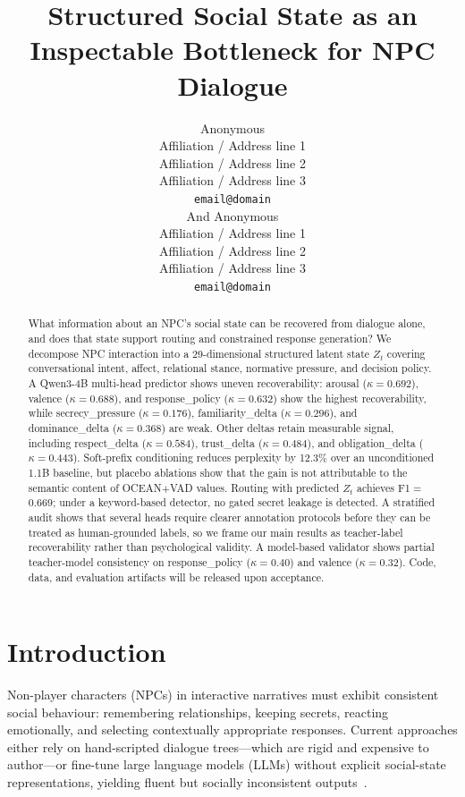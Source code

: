 \documentclass[11pt]{article}
\title{Structured Social State as an Inspectable Bottleneck for NPC Dialogue}
\author{Anonymous \\
  Affiliation / Address line 1 \\
  Affiliation / Address line 2 \\
  Affiliation / Address line 3 \\
  \texttt{email@domain} \\And
  Anonymous \\
  Affiliation / Address line 1 \\
  Affiliation / Address line 2 \\
  Affiliation / Address line 3 \\
  \texttt{email@domain} \\}
\begin{document}
\maketitle

\begin{abstract}
What information about an NPC's social state can be recovered from dialogue alone, and does that state support routing and constrained response generation?
We decompose NPC interaction into a 29-dimensional structured latent state $Z_t$ covering conversational intent, affect, relational stance, normative pressure, and decision policy.
A Qwen3-4B multi-head predictor shows uneven recoverability: arousal ($\kappa{=}0.692$), valence ($\kappa{=}0.688$), and response\_policy ($\kappa{=}0.632$) show the highest recoverability, while secrecy\_pressure ($\kappa{=}0.176$), familiarity\_delta ($\kappa{=}0.296$), and dominance\_delta ($\kappa{=}0.368$) are weak.
Other deltas retain measurable signal, including respect\_delta ($\kappa{=}0.584$), trust\_delta ($\kappa{=}0.484$), and obligation\_delta ($\kappa{=}0.443$).
Soft-prefix conditioning reduces perplexity by 12.3\% over an unconditioned 1.1B baseline, but placebo ablations show that the gain is not attributable to the semantic content of OCEAN+VAD values.
Routing with predicted $Z_t$ achieves F1$=$0.669; under a keyword-based detector, no gated secret leakage is detected.
A stratified audit shows that several heads require clearer annotation protocols before they can be treated as human-grounded labels, so we frame our main results as teacher-label recoverability rather than psychological validity.
A model-based validator shows partial teacher-model consistency on response\_policy ($\kappa{=}0.40$) and valence ($\kappa{=}0.32$).
Code, data, and evaluation artifacts will be released upon acceptance.
\end{abstract}

\section{Introduction}
\label{sec:intro}

Non-player characters (NPCs) in interactive narratives must exhibit consistent social behaviour: remembering relationships, keeping secrets, reacting emotionally, and selecting contextually appropriate responses.
Current approaches either rely on hand-scripted dialogue trees---which are rigid and expensive to author---or fine-tune large language models (LLMs) without explicit social-state representations, yielding fluent but socially inconsistent outputs~\cite{park2023generative,wang2023voyager}.
\end{document}
